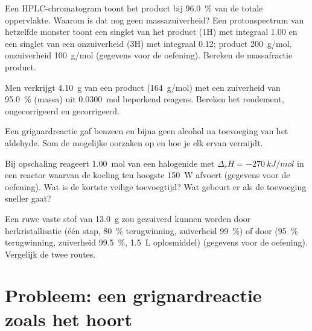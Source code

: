 \begin{exercise}[$\star\star$]\label{exo:b2:lab-techniques-2:8}
Een HPLC-chromatogram toont het product bij 96.0~\% van de totale oppervlakte. Waarom is dat nog geen massazuiverheid? Een
protonspectrum van hetzelfde monster toont een singlet van het product (1H) met integraal 1.00 en een singlet van een onzuiverheid
(3H) met integraal 0.12; product \qty{200}{g/mol}, onzuiverheid \qty{100}{g/mol} (gegevens voor de oefening). Bereken de
massafractie product.
\end{exercise}

\begin{exercise}[$\star\star$]\label{exo:b2:lab-techniques-2:9}
Men verkrijgt \qty{4.10}{g} van een product (\qty{164}{g/mol}) met een zuiverheid van 95.0~\% (massa) uit \qty{0.0300}{mol}
beperkend reagens. Bereken het rendement, ongecorrigeerd en gecorrigeerd.
\end{exercise}

\begin{exercise}[$\star\star\star$]\label{exo:b2:lab-techniques-2:10}
Een grignardreactie gaf benzeen en bijna geen alcohol na toevoeging van het aldehyde. Som de
mogelijke oorzaken op en hoe je elk ervan vermijdt.
\end{exercise}

\begin{exercise}[$\star\star\star$]\label{exo:b2:lab-techniques-2:11}
Bij opschaling reageert \qty{1.00}{mol} van een halogenide met $\Delta_rH = \qty{-270}{kJ/mol}$ in een reactor waarvan de
koeling ten hoogste \qty{150}{W} afvoert (gegevens voor de oefening). Wat is de kortste veilige toevoegtijd? Wat
gebeurt er als de toevoeging sneller gaat?
\end{exercise}

\begin{exercise}[$\star\star\star$]\label{exo:b2:lab-techniques-2:12}
Een ruwe vaste stof van \qty{13.0}{g} zou gezuiverd kunnen worden door herkristallisatie (één stap, 80~\% terugwinning, zuiverheid
99~\%) of door  (95~\% terugwinning, zuiverheid 99.5~\%, \qty{1.5}{L} oplosmiddel) (gegevens voor de
oefening). Vergelijk de twee routes.
\end{exercise}

\section{Probleem: een grignardreactie zoals het hoort}

